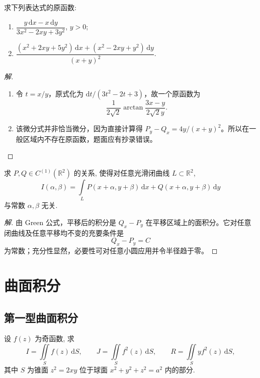 \documentclass[../../数学分析培优讲义(答案版).tex]{subfiles}
\begin{document}
\begin{example}
求下列表达式的原函数:
\begin{enumerate}[label=(\arabic*)]
    \item $\displaystyle\dfrac{y\,\mathrm{d}x-x\,\mathrm{d}y}{3x^2-2xy+3y^2}$, $y>0$;
    \item $\displaystyle\dfrac{(x^2+2xy+5y^2)\,\mathrm{d}x+(x^2-2xy+y^2)\,\mathrm{d}y}{(x+y)^2}$.
\end{enumerate}
\end{example}

\begin{proof}[解]
\begin{enumerate}[label=(\arabic*)]
\item 令 $t=x/y$，原式化为 $\mathrm{d}t/(3t^2-2t+3)$，故一个原函数为
\[
\dfrac{1}{2\sqrt{2}}\arctan\dfrac{3x-y}{2\sqrt{2}y}.
\]
\item 该微分式并非恰当微分，因为直接计算得 $P_y-Q_x=4y/(x+y)^2$。所以在一般区域内不存在原函数，题面应有抄录错误。
\end{enumerate}
\end{proof}

\begin{example}
求 $P,Q\in C^{(1)}(\mathbb{R}^2)$ 的关系, 使得对任意光滑闭曲线 $L\subset\mathbb{R}^2$,
\[
    I(\alpha,\beta)=\int\limits_LP(x+\alpha,y+\beta)\,\mathrm{d}x+Q(x+\alpha,y+\beta)\,\mathrm{d}y
\]
与常数 $\alpha,\beta$ 无关.
\end{example}

\begin{proof}[解]
由 Green 公式，平移后的积分是 $Q_x-P_y$ 在平移区域上的面积分。它对任意闭曲线及任意平移均不变的充要条件是
\[
Q_x-P_y=C
\]
为常数；充分性显然，必要性可对任意小圆应用并令半径趋于零。
\end{proof}

\newpage

\section{曲面积分}

\subsection{第一型曲面积分}

\begin{example}
设 $f(z)$ 为奇函数, 求
\[
    I=\iint\limits_Sf(z)\,\mathrm{d}S,\qquad
    J=\iint\limits_Sf^2(z)\,\mathrm{d}S,\qquad
    R=\iint\limits_Syf^2(z)\,\mathrm{d}S,
\]
其中 $S$ 为锥面 $z^2=2xy$ 位于球面 $x^2+y^2+z^2=a^2$ 内的部分.
\end{example}
\end{document}
